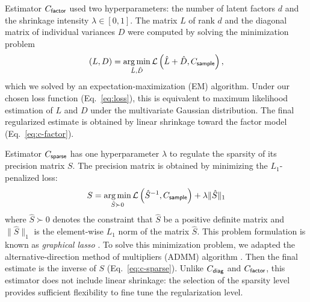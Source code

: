 \documentclass[10pt]{article}
\newcommand{\loss}[1]{\mathcal L\left(#1\right)}
\DeclareMathOperator*{\argmin}{arg\,min}
\begin{document}
Estimator $C_{\sf factor}$ used two hyperparameters: the number of latent factors $d$ and the shrinkage intensity $\lambda \in [0, 1]$.  
The matrix $L$ of rank $d$ and the diagonal matrix of individual variances $D$ were computed by solving the minimization problem
\begin{equation}
(L,D) = \argmin\limits_{\hat L,\hat D} \loss{\hat L + \hat D,C_{\sf sample}},
\end{equation}
which we solved by an expectation-maximization (EM) algorithm.  Under our chosen loss function (Eq.~\ref{eq:loss}), this is equivalent to maximum likelihood estimation of $L$ and $D$ under the multivariate Gaussian distribution.  The final regularized estimate is obtained by linear shrinkage toward the factor model (Eq.~\ref{eq:c-factor}). 

Estimator $C_{\sf sparse}$  has one hyperparameter $\lambda$ to regulate the sparsity of its precision matrix $S$. The precision matrix is obtained by minimizing the $L_1$-penalized loss:
\begin{equation}
S = \argmin\limits_{\hat S \succ 0} \loss{{\hat S}^{-1},C_{\sf sample}} + \lambda \|\hat S \|_1
\end{equation}
where $\hat S\succ 0$ denotes the constraint that $\hat S$ be a positive definite matrix and $\|\hat S\|_1$ is the element-wise $L_1$ norm of the matrix $\hat S$. This problem formulation is known as \emph{graphical lasso} \cite{Meinshausen:2006, Friedman:2008}. To solve this minimization problem, we adapted the alternative-direction method of multipliers (ADMM) algorithm \cite{Ma:2013}. 
Then the final estimate is the inverse of $S$ (Eq.~\ref{eq:c-sparse}). Unlike $C_{\sf diag}$ and $C_{\sf factor}$, this estimator does not include linear shrinkage: the selection of the sparsity level provides sufficient flexibility to fine tune the regularization level.
\end{document}
